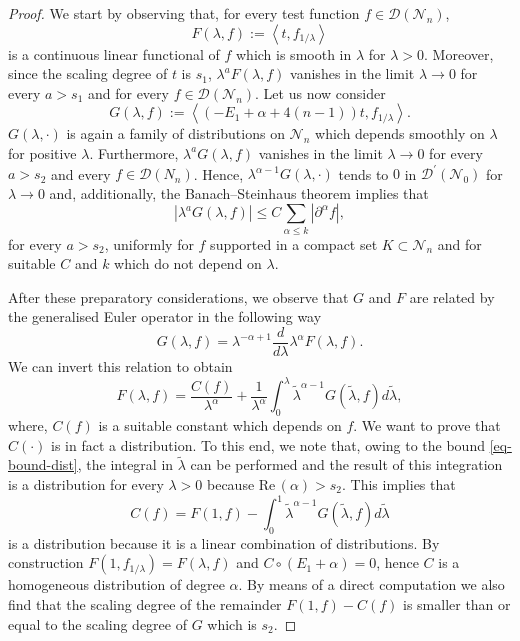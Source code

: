\documentclass[a4paper,10pt,twoside]{article}
\numberwithin{equation}{section}
\newcounter{and}
\def\N{\mathcal{N}}
\def\D{\mathcal{D}}
\def\Ree{\mathrm{Re}\,}
\theoremstyle{plain}
\theoremstyle{definition}
\begin{document}
\begin{proof}
We start by observing that, for every test function $f\in\D(\N_n)$, 
\[
F(\lambda, f) := \left\langle t, f_{1/\lambda} \right\rangle
\] 
is a continuous linear functional of $f$ which is smooth in $\lambda$ for $\lambda>0$. Moreover, since the scaling degree of $t$ is $s_1$, $\lambda^{a}F(\lambda, f)$ vanishes in the limit $\lambda \to 0$ for every $a > s_1$ and for every $f\in\D(\N_n)$.
Let us now consider 
\[
G(\lambda, f)  :=  \left\langle(-E_1+\alpha+4(n-1))t, f_{1/\lambda}\right\rangle. 
\]
$G(\lambda, \cdot)$ is again a family of distributions on $\N_n$ which depends smoothly on $\lambda$ for positive $\lambda$. Furthermore, $\lambda^{a}G(\lambda, f)$ vanishes in the limit $\lambda\to 0$ for every $a > s_2$ and every $f\in\D(N_n)$. Hence,  
$\lambda^{\alpha-1} G(\lambda, \cdot)$ tends to $0$ in $\D^\prime(\N_0)$ for $\lambda\to 0$ and, additionally, the Banach--Steinhaus theorem implies that 
\begin{equation}\label{eq-bound-dist}
\left| \lambda^{a} G(\lambda,f) \right|  \leq C \sum_{\alpha\leq k} |\partial^{\alpha} f|,
\end{equation}
for every $a>s_2$, uniformly for $f$ supported in a compact set $K\subset \N_n$ and for suitable $C$ and $k$ which do not depend on $\lambda$.

After these preparatory considerations, we observe that $G$ and $F$ are related by the generalised Euler operator in the following way
\[
G(\lambda, f) =  \lambda^{-\alpha+1} \frac{d}{d\lambda} \lambda^{\alpha} F(\lambda, f).
\]
We can invert this relation to obtain
\[
F(\lambda, f) =  \frac{C(f)}{\lambda^{\alpha}} + \frac{1}{\lambda^\alpha} \int_0^\lambda  \tilde{\lambda}^{\alpha-1} G(\tilde{\lambda}, f) d\tilde{\lambda},
\]
where, $C(f)$ is a suitable constant which depends on $f$. We want to prove that $C(\cdot)$ is in fact a distribution. To this end, we note that, owing to the bound \eqref{eq-bound-dist}, the integral in $\tilde\lambda$ can be performed and the result of this integration is a distribution for every $\lambda > 0$ because $\Ree(\alpha) > s_2$.  
This implies that 
\[
C(f) = F(1, f)  - \int_0^1  \tilde{\lambda}^{\alpha-1} G(\tilde{\lambda}, f) d\tilde{\lambda}
\]
is a distribution because it is a linear combination of distributions. By construction $F(1,f_{1/\lambda})=F(\lambda,f)$ and $C\circ (E_1+\alpha) =0$, hence $C$ is a homogeneous distribution of degree $\alpha$. By means of a direct computation we also find that the scaling degree of the remainder $F(1,f)-C(f)$ is smaller than or equal to the scaling degree of $G$ which is $s_2$.
\end{proof}
\end{document}
